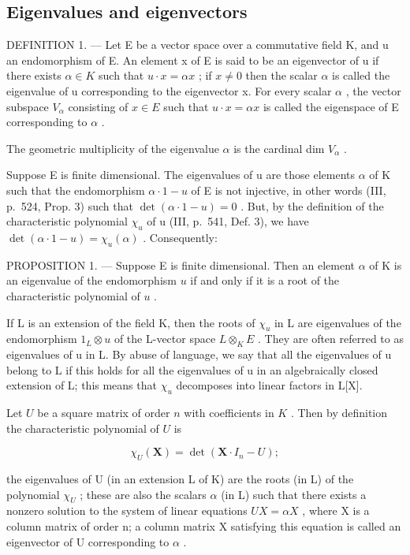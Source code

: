 \subsection{Eigenvalues and eigenvectors}

DEFINITION 1. --- Let E be a vector space over a commutative field K, and u an endomorphism of E. An element x of E is said to be an eigenvector of u if there exists \(\alpha \in K\) such that \(u \cdot x = \alpha x\) ; if \(x \neq 0\) then the scalar \(\alpha\) is called the eigenvalue of u corresponding to the eigenvector x. For every scalar \(\alpha\) , the vector subspace \(V_{\alpha}\) consisting of \(x \in E\) such that \(u \cdot x = \alpha x\) is called the eigenspace of E corresponding to \(\alpha\) .

The geometric multiplicity of the eigenvalue \(\alpha\) is the cardinal dim \(V_{\alpha}\) .

Suppose E is finite dimensional. The eigenvalues of u are those elements \(\alpha\) of K such that the endomorphism \(\alpha \cdot 1 - u\) of E is not injective, in other words (III, p.~524, Prop. 3) such that \(\det(\alpha \cdot 1 - u) = 0\) . But, by the definition of the characteristic polynomial \(\chi_{u}\) of u (III, p.~541, Def. 3), we have \(\det(\alpha \cdot 1 - u) = \chi_{u}(\alpha)\) . Consequently:

PROPOSITION 1. --- Suppose E is finite dimensional. Then an element \(\alpha\) of K is an eigenvalue of the endomorphism \(u\) if and only if it is a root of the characteristic polynomial of \(u\) .

If L is an extension of the field K, then the roots of \(\chi_{u}\) in L are eigenvalues of the endomorphism \(1_{L} \otimes u\) of the L-vector space \(L \otimes_{K} E\) . They are often referred to as eigenvalues of u in L. By abuse of language, we say that all the eigenvalues of u belong to L if this holds for all the eigenvalues of u in an algebraically closed extension of L; this means that \(\chi_{u}\) decomposes into linear factors in L{[}X{]}.

Let \(U\) be a square matrix of order \(n\) with coefficients in \(K\) . Then by definition the characteristic polynomial of \(U\) is

\[
\chi_ {U} (\mathbf {X}) = \det \left(\mathbf {X} \cdot I _ {n} - U\right);
\]

the eigenvalues of U (in an extension L of K) are the roots (in L) of the polynomial \(\chi_{U}\) ; these are also the scalars \(\alpha\) (in L) such that there exists a nonzero solution to the system of linear equations \(UX = \alpha X\) , where X is a column matrix of order n; a column matrix X satisfying this equation is called an eigenvector of U corresponding to \(\alpha\) .

